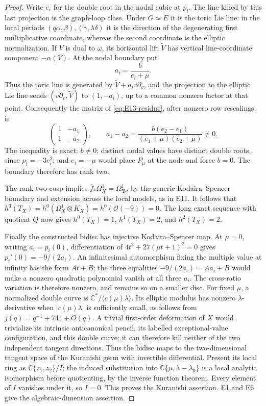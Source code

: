 \begin{proof}
Write $e_i$ for the double root in the nodal cubic at $p_i$.
The line killed by this last projection is the graph-loop class.
Under $G\simeq E$ it is the toric Lie line: in the local periods
$(q\alpha,\beta),(\gamma,\lambda\delta)$ it is the direction
of the degenerating first multiplicative coordinate, whereas the
second coordinate is the elliptic normalization. If $V$ is dual to
$\omega$, its horizontal lift $\widetilde V$ has vertical
line-coordinate component $-\alpha(V)$. At the nodal boundary put
\[
 a_i=\frac{b}{e_i+\mu}.
\]
Thus the toric line is generated by
$\widetilde V+a_i v\partial_v$, and the projection to the elliptic
Lie line sends $(v\partial_v,\widetilde V)$ to $(1,-a_i)$, up to
a common nonzero factor at that point. Consequently the matrix of
\eqref{eq:E13-residue}, after nonzero row rescalings, is
\[
 \begin{pmatrix}1&-a_1\\1&-a_2\end{pmatrix},\qquad
 a_1-a_2=\frac{b(e_2-e_1)}{(e_1+\mu)(e_2+\mu)}\ne0.
\]
The inequality is exact: $b\ne0$; distinct nodal values have
distinct double roots, since $p_i=-3e_i^2$; and $e_i=-\mu$ would
place $P_\mu$ at the node and force $b=0$. The boundary therefore
has rank two.

The rank-two cusp implies
$\bar f_*\Omega_X^1=\Omega_{\mathfrak B}^1$, by the generic
Kodaira--Spencer boundary and extension across the local models,
as in E11. It follows that
$h^3(T_X)=h^0(\Omega_X^1\otimes K_X)
=h^0(\mathcal O(-9))=0$. The long exact sequence with quotient
$Q$ now gives $h^0(T_X)=1$, $h^1(T_X)=2$, and $h^2(T_X)=2$.

Finally the constructed bidisc has injective Kodaira--Spencer map.
At $\mu=0$, writing $a_i=p_i(0)$, differentiation of
$4t^3+27(\mu t+1)^2=0$ gives $p_i'(0)=-9/(2a_i)$.
An infinitesimal automorphism fixing the multiple value at infinity
has the form $At+B$; the three equalities
$-9/(2a_i)=Aa_i+B$ would make a nonzero quadratic polynomial vanish
at all three $a_i$. The cross-ratio variation is therefore nonzero,
and remains so on a smaller disc. For fixed $\mu$, a normalized
double curve is $\mathbb C^*/\langle c(\mu)\lambda\rangle$.
Its elliptic modulus has nonzero $\lambda$-derivative when
$|c(\mu)\lambda|$ is sufficiently small, as follows from
$j(q)=q^{-1}+744+O(q)$. A trivial first-order deformation of $X$
would trivialize its intrinsic anticanonical pencil, its labelled
exceptional-value configuration, and this double curve; it can
therefore kill neither of the two independent tangent directions.
Thus the bidisc maps to the two-dimensional tangent space of the
Kuranishi germ with invertible differential. Present its local
ring as $\mathbb C\{z_1,z_2\}/I$; the induced substitution into
$\mathbb C\{\mu,\lambda-\lambda_0\}$ is a local analytic
isomorphism before quotienting, by the inverse function theorem.
Every element of $I$ vanishes under it, so $I=0$. This proves the
Kuranishi assertion. E1 and E6 give the algebraic-dimension assertion.
\end{proof}


